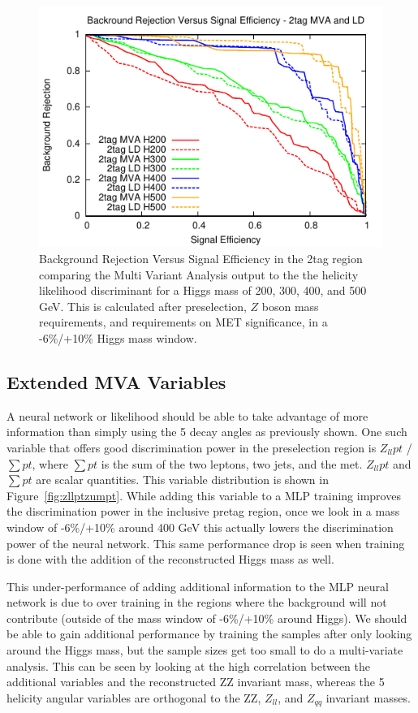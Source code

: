 \begin{figure}[htb!]
\begin{center}
\centerline{
\includegraphics[width=0.6\linewidth]{Optimization/plots/NN/2tag_MVA_LD_ROC.pdf}
}
\caption{
Background Rejection Versus Signal Efficiency in the 2tag region comparing the Multi Variant Analysis output to the the helicity likelihood discriminant for a Higgs mass of 200, 300, 400, and 500 GeV. This is calculated after preselection, $Z$ boson mass requirements, and requirements on MET significance, in a -6\%/+10\% Higgs mass window.
}
\label{fig:nn_2tag_ROC}
\end{center}
\end{figure}



\subsection{Extended MVA Variables}

A neural network or likelihood should be able to take advantage of more information than simply using the 5 decay angles as previously shown. One such variable that offers good discrimination power in the preselection region is $Z_{ll}pt$ / $\sum{pt}$, where $\sum{pt}$ is the sum of the two leptons, two jets, and the met. $Z_{ll}pt$ and $\sum{pt}$ are scalar quantities.  This variable distribution is shown in Figure~\ref{fig:zllptzumpt}. While adding this variable to a MLP training improves the discrimination power in the inclusive pretag region, once we look in a mass window of -6\%/+10\% around 400 GeV this actually lowers the discrimination power of the neural network. This same performance drop is seen when training is done with the addition of the reconstructed Higgs mass as well.

This under-performance of adding additional information to the MLP neural network is due to over training in the regions where the background will not contribute (outside of the mass window of -6\%/+10\% around Higgs).  We should be able to gain additional performance by training the samples after only looking around the Higgs mass, but the sample sizes get too small to do a multi-variate analysis.  This can be seen by looking at the high correlation between the additional variables and the reconstructed ZZ invariant mass, whereas the 5 helicity angular variables are orthogonal to the ZZ, $Z_{ll}$, and $Z_{qq}$ invariant masses.  



